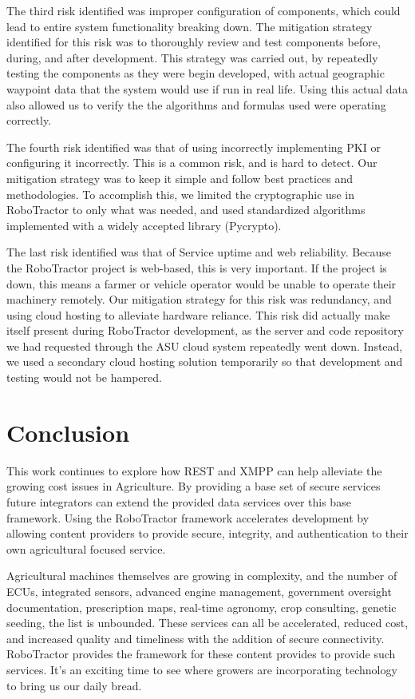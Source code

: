 \documentclass[conference,12pt]{IEEEtran}
\begin{document}
The third risk identified was improper configuration of components, which could lead to entire system functionality breaking down. The mitigation strategy identified for this risk was to thoroughly review and test components before, during, and after development. This strategy was carried out, by repeatedly testing the components as they were begin developed, with actual geographic waypoint data that the system would use if run in real life. Using this actual data also allowed us to verify the the algorithms and formulas used were operating correctly.

The fourth risk identified was that of using incorrectly implementing PKI or configuring it incorrectly. This is a common risk, and is hard to detect. Our mitigation strategy was to keep it simple and follow best practices and methodologies. To accomplish this, we limited the cryptographic use in RoboTractor to only what was needed, and used standardized algorithms implemented with a widely accepted library (Pycrypto). 

The last risk identified was that of Service uptime and web reliability. Because the RoboTractor project is web-based, this is very important. If the project is down, this means a farmer or vehicle operator would be unable to operate their machinery remotely. Our mitigation strategy for this risk was redundancy, and using cloud hosting to alleviate hardware reliance. This risk did actually make itself present during RoboTractor development, as the server and code repository we had requested through the ASU cloud system repeatedly went down. Instead, we used a secondary cloud hosting solution temporarily so that development and testing would not be hampered. 

\section{Conclusion}
This work continues to explore how REST and XMPP can help alleviate the growing
cost issues in Agriculture. By providing a base set of secure services future
integrators can extend the provided data services over this base framework.
Using the RoboTractor framework accelerates development by allowing content
providers to provide secure, integrity, and authentication to their own
agricultural focused service. 

Agricultural machines themselves are growing in complexity, and the number of ECUs,
integrated sensors, advanced engine management, government oversight
documentation, prescription maps, real-time agronomy, crop consulting, genetic
seeding, the list is unbounded. These services can all be accelerated, reduced
cost, and increased quality and timeliness with the addition of secure
connectivity. RoboTractor provides the framework for these content provides to
provide such services. It's an exciting time to see where growers are
incorporating technology to bring us our daily bread.
\end{document}
